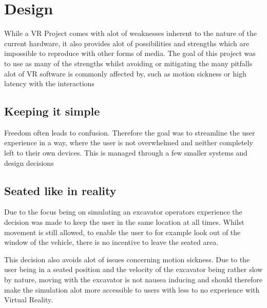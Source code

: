 \documentclass[journal]{vgtc}                     %
\begin{document}
\section{Design}

While a VR Project comes with alot of weaknesses inherent to the nature of the current hardware, it also provides alot of possibilities and strengths which are impossible to reproduce with other forms of media.
The goal of this project was to use as many of the strengths whilst avoiding or mitigating the many pitfalls alot of VR software is commonly affected by, such as motion sickness or high latency with the interactions


\subsection{Keeping it simple}

Freedom often leads to confusion. Therefore the goal was to streamline the user experience in a way, where the user is not overwhelmed and neither completely left to their own devices. This is managed through a few smaller systems and design decisions


\subsection{Seated like in reality}

Due to the focus being on simulating an excavator operators experience the decision was made to keep the user in the same location at all times. Whilst movement is still allowed, to enable the user to for example look out of the window of the vehicle, there is no incentive to leave the seated area.

This decision also avoids alot of issues concerning motion sickness. Due to the user being in a seated position and the velocity of the excavator being rather slow by nature, moving with the excavator is not nausea inducing and should therefore make the simulation alot more accessible to users with less to no experience with Virtual Reality.
\end{document}
